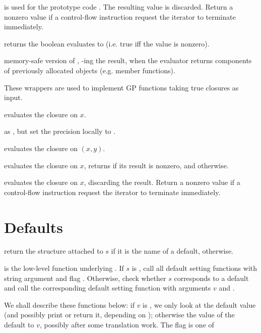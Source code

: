  is used for the prototype code
. The resulting value is discarded.  Return a nonzero value if a
control-flow instruction request the iterator to terminate immediately.

 returns the boolean
 evaluates to (i.e. true iff the value is nonzero).

 memory-safe version of ,
-ing the result, when the evaluator returns components of
previously allocated objects (e.g. member functions).

These wrappers are used to implement GP functions taking true closures as
input.

 evaluates the closure  on $x$.

 as ,
but set the precision locally to .

 evaluates the closure 
on $(x,y)$.

 evaluates the closure  on
$x$, returns  if its result is nonzero, and  otherwise.

 evaluates the closure  on
$x$, discarding the result. Return a nonzero value if a control-flow
instruction request the iterator to terminate immediately.

\section{Defaults}

 return the 
structure attached to $s$ if it is the name of a default, 
otherwise.

 is the
low-level function underlying . If $s$ is , call all
default setting functions with string argument  and flag
. Otherwise, check whether $s$ corresponds to a default
and call the corresponding default setting function with arguments $v$ and
\fl.

We shall describe these functions below: if $v$ is , we only look
at the default value (and possibly print or return it, depending on
); otherwise the value of the default to $v$, possibly after some
translation work. The flag is one of

